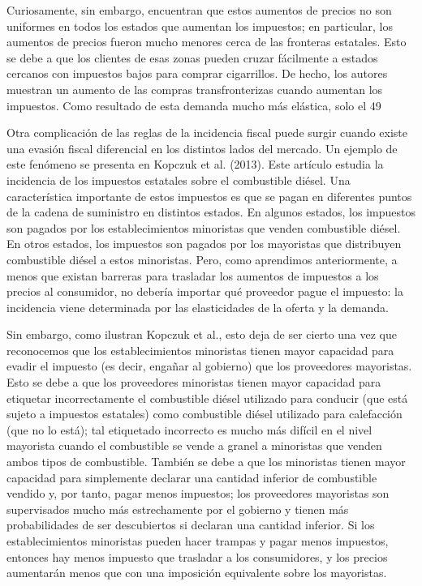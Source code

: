 \documentclass[10pt,a4paper]{article}
\begin{document}
Curiosamente, sin embargo, encuentran que estos aumentos de precios no son uniformes en todos los estados que aumentan los impuestos; en particular, los aumentos de precios fueron mucho menores cerca de las fronteras estatales. Esto se debe a que los clientes de esas zonas pueden cruzar fácilmente a estados cercanos con impuestos bajos para comprar cigarrillos. De hecho, los autores muestran un aumento de las compras transfronterizas cuando aumentan los impuestos. Como resultado de esta demanda mucho más elástica, solo el 49 %

Otra complicación de las reglas de la incidencia fiscal puede surgir cuando existe una evasión fiscal diferencial en los distintos lados del mercado. Un ejemplo de este fenómeno se presenta en Kopczuk et al. (2013). Este artículo estudia la incidencia de los impuestos estatales sobre el combustible diésel. Una característica importante de estos impuestos es que se pagan en diferentes puntos de la cadena de suministro en distintos estados. En algunos estados, los impuestos son pagados por los establecimientos minoristas que venden combustible diésel. En otros estados, los impuestos son pagados por los mayoristas que distribuyen combustible diésel a estos minoristas. Pero, como aprendimos anteriormente, a menos que existan barreras para trasladar los aumentos de impuestos a los precios al consumidor, no debería importar qué proveedor pague el impuesto: la incidencia viene determinada por las elasticidades de la oferta y la demanda.

Sin embargo, como ilustran Kopczuk et al., esto deja de ser cierto una vez que reconocemos que los establecimientos minoristas tienen mayor capacidad para evadir el impuesto (es decir, engañar al gobierno) que los proveedores mayoristas. Esto se debe a que los proveedores minoristas tienen mayor capacidad para etiquetar incorrectamente el combustible diésel utilizado para conducir (que está sujeto a impuestos estatales) como combustible diésel utilizado para calefacción (que no lo está); tal etiquetado incorrecto es mucho más difícil en el nivel mayorista cuando el combustible se vende a granel a minoristas que venden ambos tipos de combustible. También se debe a que los minoristas tienen mayor capacidad para simplemente declarar una cantidad inferior de combustible vendido y, por tanto, pagar menos impuestos; los proveedores mayoristas son supervisados mucho más estrechamente por el gobierno y tienen más probabilidades de ser descubiertos si declaran una cantidad inferior. Si los establecimientos minoristas pueden hacer trampas y pagar menos impuestos, entonces hay menos impuesto que trasladar a los consumidores, y los precios aumentarán menos que con una imposición equivalente sobre los mayoristas.
\end{document}
